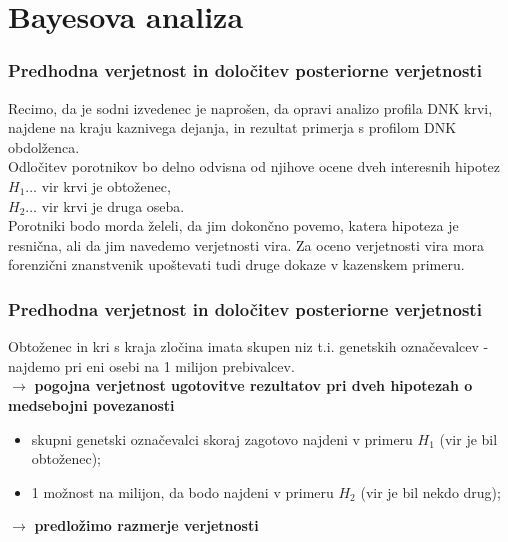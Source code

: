 \documentclass{beamer}
\begin{document}
\section{Bayesova analiza}

\begin{frame}
    \frametitle{Predhodna verjetnost in določitev posteriorne verjetnosti}
    Recimo, da je sodni izvedenec je naprošen, da opravi analizo profila DNK krvi, najdene na kraju kaznivega dejanja, in rezultat primerja s profilom DNK 
    obdolženca.\\ \vspace{3mm}
   Odločitev porotnikov bo delno odvisna od njihove ocene dveh interesnih
    hipotez\\
    $H_1 \dots$ vir krvi je obtoženec,\\
    $H_2 \dots$ vir krvi je druga oseba.\\ \vspace{3mm}
    Porotniki bodo morda želeli, da jim dokončno povemo, katera hipoteza je resnična, ali da jim navedemo verjetnosti vira. Za oceno verjetnosti 
    vira mora forenzični znanstvenik upoštevati tudi druge dokaze v kazenskem primeru.
\end{frame}

\begin{frame}
    \frametitle{Predhodna verjetnost in določitev posteriorne verjetnosti}
    Obtoženec in kri s kraja zločina imata skupen niz t.i. genetskih označevalcev - najdemo pri eni osebi na 1 milijon prebivalcev.\\ \vspace{3mm}
    \centering
    $\rightarrow$ \textbf{pogojna verjetnost ugotovitve rezultatov pri dveh hipotezah o medsebojni povezanosti}
    \begin{itemize}
        \item skupni genetski označevalci skoraj zagotovo najdeni v primeru $H_1$ (vir je bil obtoženec);
        \item 1 možnost na milijon, da bodo najdeni v primeru $H_2$ (vir je bil nekdo drug);
    \end{itemize}
    \centering 
    $\rightarrow$ \textbf{predložimo razmerje verjetnosti}
\end{frame}
\end{document}
